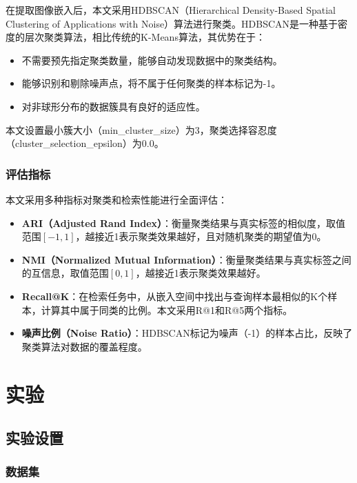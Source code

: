 \documentclass[a4paper]{article}
\begin{document}
在提取图像嵌入后，本文采用HDBSCAN（Hierarchical Density-Based Spatial Clustering of Applications with Noise）算法进行聚类。HDBSCAN是一种基于密度的层次聚类算法，相比传统的K-Means算法，其优势在于：

\begin{itemize}
    \item 不需要预先指定聚类数量，能够自动发现数据中的聚类结构。
    \item 能够识别和剔除噪声点，将不属于任何聚类的样本标记为-1。
    \item 对非球形分布的数据簇具有良好的适应性。
\end{itemize}

本文设置最小簇大小（min\_cluster\_size）为3，聚类选择容忍度（cluster\_selection\_epsilon）为0.0。

\subsubsection{评估指标}

本文采用多种指标对聚类和检索性能进行全面评估：

\begin{itemize}
    \item \textbf{ARI（Adjusted Rand Index）}：衡量聚类结果与真实标签的相似度，取值范围$[-1,1]$，越接近1表示聚类效果越好，且对随机聚类的期望值为0。
    \item \textbf{NMI（Normalized Mutual Information）}：衡量聚类结果与真实标签之间的互信息，取值范围$[0,1]$，越接近1表示聚类效果越好。
    \item \textbf{Recall@K}：在检索任务中，从嵌入空间中找出与查询样本最相似的K个样本，计算其中属于同类的比例。本文采用R@1和R@5两个指标。
    \item \textbf{噪声比例（Noise Ratio）}：HDBSCAN标记为噪声（-1）的样本占比，反映了聚类算法对数据的覆盖程度。
\end{itemize}

\section{实验}
\label{sec:exp}

\subsection{实验设置}

\subsubsection{数据集}
\end{document}

